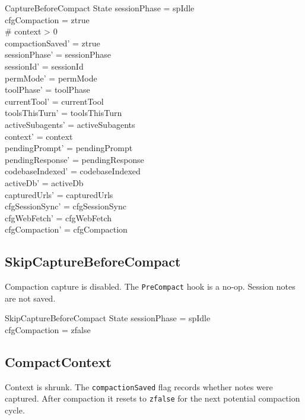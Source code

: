 \documentclass[a4paper,10pt,fleqn]{article}
\begin{document}
\begin{schema}{CaptureBeforeCompact}
  \Delta State
  \where
  sessionPhase = spIdle \\
  cfgCompaction = ztrue \\
  \# context > 0 \\
  compactionSaved' = ztrue \\
  sessionPhase' = sessionPhase \\
  sessionId' = sessionId \\
  permMode' = permMode \\
  toolPhase' = toolPhase \\
  currentTool' = currentTool \\
  toolsThisTurn' = toolsThisTurn \\
  activeSubagents' = activeSubagents \\
  context' = context \\
  pendingPrompt' = pendingPrompt \\
  pendingResponse' = pendingResponse \\
  codebaseIndexed' = codebaseIndexed \\
  activeDb' = activeDb \\
  capturedUrls' = capturedUrls \\
  cfgSessionSync' = cfgSessionSync \\
  cfgWebFetch' = cfgWebFetch \\
  cfgCompaction' = cfgCompaction
\end{schema}

\subsection{SkipCaptureBeforeCompact}

Compaction capture is disabled. The \texttt{PreCompact} hook is a
no-op. Session notes are not saved.

\begin{schema}{SkipCaptureBeforeCompact}
  \Xi State
  \where
  sessionPhase = spIdle \\
  cfgCompaction = zfalse
\end{schema}

\subsection{CompactContext}

Context is shrunk. The \texttt{compactionSaved} flag records whether
notes were captured. After compaction it resets to \texttt{zfalse}
for the next potential compaction cycle.
\end{document}
